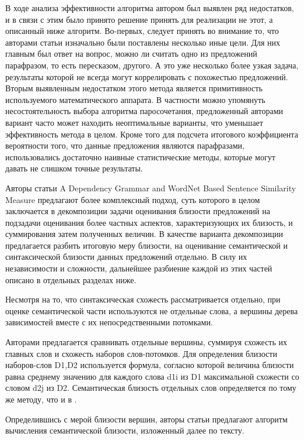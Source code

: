 В ходе анализа эффективности алгоритма автором был выявлен ряд недостатков,
и в связи с этим было принято решение принять для реализации не этот, а описанный ниже алгоритм.
Во-первых, следует принять во внимание то, что авторами статьи изначально были поставлены несколько иные
цели. Для них главным был ответ на вопрос, можно ли считать одно из предложений парафразом,
то есть пересказом, другого. А это уже несколько более узкая задача,
результаты которой не всегда могут коррелировать с похожестью предложений.
Вторым выявленным недостатком этого метода является примитивность
используемого математического аппарата. В частности можно
упомянуть несостоятельность выбора алгоритма паросочетания, 
предложенный авторами вариант часто может находить неоптимальные варианты,
что уменьшает эффективность метода в целом. Кроме того для
подсчета итогового коэффициента вероятности того, что данные предложения
являются парафразами, использовались достаточно наивные статистические методы,
которые могут давать не слишком точные результаты.

Авторы статьи A Dependency Grammar and WordNet Based Sentence Similarity Measure\cite{complexSim}
предлагают более комплексный подход, суть которого в целом заключается в декомпозиции задачи
оценивания близости предложений на подзадачи оценивания более частных аспектов, 
характеризующих их близость, и суммирования затем полученных величин.
В качестве варианта декомпозиции предлагается разбить итоговую меру близости, 
на оценивание семантической и синтаксической близости данных предложений отдельно.
В силу их независимости и сложности, дальнейшее разбиение
каждой из этих частей описано в отдельных разделах ниже.

Несмотря на то, что синтаксическая схожесть рассматривается отдельно, 
при оценке семантической части используются не отдельные слова, а
вершины дерева зависимостей вместе с их непосредственными потомками.

Авторами предлагается сравнивать отдельные вершины, суммируя схожесть их главных слов
и схожесть наборов слов-потомков.
Для определения близости наборов-слов D1,D2 используется формула, согласно которой
величина близости равна среднему значению для каждого слова d1i из D1 максимальной схожести
со словом d2j из D2. 
Семантическая близость отдельных слов определяется по тому же методу, что и в \cite{wordnetSim}.

Определившись с мерой близости вершин, авторы статьи предлагают 
алгоритм вычисления семантической близости, изложенный далее по тексту.

